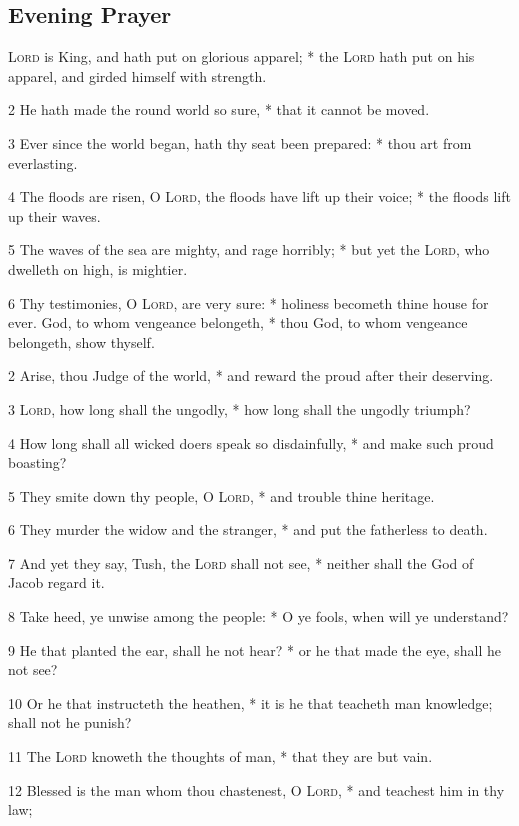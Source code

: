 \subsection{Evening Prayer}
 {\textsc{Lord}} is King, and hath put on glorious apparel; * the {\textsc{Lord}} hath put on his apparel, and girded himself with strength.\par
2 He hath made the round world so sure, * that it cannot be moved.\par
3 Ever since the world began, hath thy seat been prepared: * thou art from everlasting.\par
4 The floods are risen, O {\textsc{Lord}}, the floods have lift up their voice; * the floods lift up their waves.\par
5 The waves of the sea are mighty, and rage horribly; * but yet the {\textsc{Lord}}, who dwelleth on high, is mightier.\par
6 Thy testimonies, O {\textsc{Lord}}, are very sure: * holiness becometh thine house for ever.
 God, to whom vengeance belongeth, * thou God, to whom vengeance belongeth, show thyself.\par
2 Arise, thou Judge of the world, * and reward the proud after their deserving.\par
3 {\textsc{Lord}}, how long shall the ungodly, * how long shall the ungodly triumph?\par
4 How long shall all wicked doers speak so disdainfully, * and make such proud boasting?\par
5 They smite down thy people, O {\textsc{Lord}}, * and trouble thine heritage.\par
6 They murder the widow and the stranger, * and put the fatherless to death.\par
7 And yet they say, Tush, the {\textsc{Lord}} shall not see, * neither shall the God of Jacob regard it.\par
8 Take heed, ye unwise among the people: * O ye fools, when will ye understand?\par
9 He that planted the ear, shall he not hear? * or he that made the eye, shall he not see?\par
10 Or he that instructeth the heathen, * it is he that teacheth man knowledge; shall not he punish?\par
11 The {\textsc{Lord}} knoweth the thoughts of man, * that they are but vain.\par
12 Blessed is the man whom thou chastenest, O {\textsc{Lord}}, * and teachest him in thy law;\par
